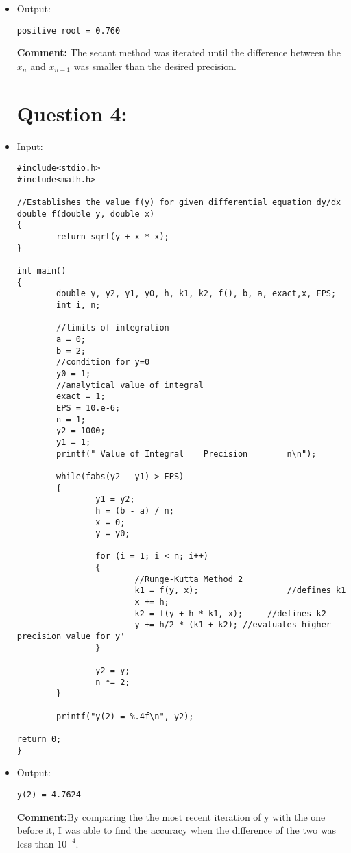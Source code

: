 \documentclass[10pt]{article}
\begin{document}
\begin{itemize}
\begin{verbatim}
        printf("positive root = %.3f\n", x);
}
\end{verbatim}
\item Output:
\begin{verbatim}
positive root = 0.760
\end{verbatim}
\textbf{Comment:} The secant method was iterated until the difference between the $x_n$ and $x_{n-1}$ was smaller than the desired precision. 

\section*{Question 4:}
\item Input: 
\begin{verbatim}
#include<stdio.h>
#include<math.h>

//Establishes the value f(y) for given differential equation dy/dx
double f(double y, double x)
{
        return sqrt(y + x * x);
}

int main()
{
        double y, y2, y1, y0, h, k1, k2, f(), b, a, exact,x, EPS;
        int i, n;
        
        //limits of integration
        a = 0;
        b = 2;
        //condition for y=0
        y0 = 1;
        //analytical value of integral
        exact = 1;
        EPS = 10.e-6;
        n = 1;
        y2 = 1000;
        y1 = 1;
        printf(" Value of Integral    Precision        n\n");
        
        while(fabs(y2 - y1) > EPS)
        {
                y1 = y2;
                h = (b - a) / n;
                x = 0;
                y = y0;
                
                for (i = 1; i < n; i++)
                {
                        //Runge-Kutta Method 2
                        k1 = f(y, x);				   //defines k1
                        x += h;
                        k2 = f(y + h * k1, x);	   //defines k2
                        y += h/2 * (k1 + k2); //evaluates higher precision value for y'
                }

                y2 = y;
                n *= 2;
        }

        printf("y(2) = %.4f\n", y2);

return 0;
}
\end{verbatim}
\item Output:
\begin{verbatim}
y(2) = 4.7624
\end{verbatim}
\textbf{Comment:}By comparing the the most recent iteration of y with the one before it, I was able to find the accuracy when the difference of the two was less than $10^{-4}$.


\end{itemize}
\end{document}
